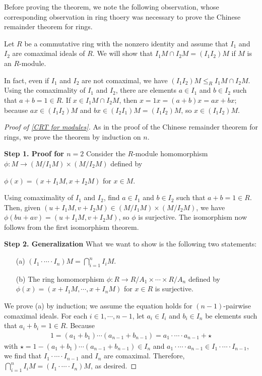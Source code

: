 Before proving the theorem, we note the following observation, whose corresponding observation in ring thoery was necessary to prove the Chinese remainder theorem for rings.
\begin{obs}
    Let $R$ be a commutative ring with the nonzero identity and assume that $I_1$ and $I_2$ are comaximal ideals of $R$.
    We will show that $I_1M\cap I_2M=(I_1I_2)M$ if $M$ is an $R$-module.

    In fact, even if $I_1$ and $I_2$ are not comaximal, we have $(I_1I_2)M\leq_R I_1M\cap I_2M$.
    Using the comaximality of $I_1$ and $I_2$, there are elements $a\in I_1$ and $b\in I_2$ such that $a+b=1\in R$.
    If $x\in I_1M\cap I_2M$, then $x=1x=(a+b)x=ax+bx$; because $ax\in(I_1I_2)M$ and $bx\in(I_2I_1)M=(I_1I_2)M$, so $x\in(I_1I_2)M$.
\end{obs}
\begin{proof}[Proof of \cref{CRT for modules}]
    As in the proof of the Chinese remainder theorem for rings, we prove the theorem by induction on $n$.

    \textbf{Step 1. Proof for $n=2$}\newline\indent
    Consider the $R$-module homomorphism $\phi: M\rightarrow (M/{I_1M})\times (M/{I_2M})$ defined by
    \begin{center}
        $\phi(x)=(x+I_1M, x+I_2M)$ for $x\in M$.
    \end{center}
    Using comaximality of $I_1$ and $I_2$, find $a\in I_1$ and $b\in I_2$ such that $a+b=1\in R$.
    Then, given $(u+I_1M, v+I_2M)\in (M/{I_1M})\times (M/{I_2M})$, we have $\phi(bu+av)=(u+I_1M, v+I_2M)$, so $\phi$ is surjective.
    The isomorphism now follows from the first isomorphism theorem.

    \textbf{Step 2. Generalization}\newline\indent
    What we want to show is the following two statements:
    \begin{enumerate}
        \item[(a)]
        {
            $(I_1\cdot\cdots\cdot I_n)M=\bigcap_{i=1}^n I_iM$.
        }
        \item[(b)]
        {
            The ring homomorphism $\phi:R\rightarrow R/A_1\times\cdots\times R/A_n$ defined by $\phi(x)=(x+I_1M, \cdots, x+I_nM)$ for $x\in R$ is surjective.
        }
    \end{enumerate}
    We prove (a) by induction; we assume the equation holds for $(n-1)$-pairwise comaximal ideals.
    For each $i\in 1, \cdots, n-1$, let $a_i\in I_i$ and $b_i\in I_n$ be elements such that $a_i+b_i=1\in R$.
    Because
    \begin{align*}
        1=(a_1+b_1)\cdots(a_{n-1}+b_{n-1})=a_1\cdot\cdots\cdot a_{n-1}+\star
    \end{align*}
    with $\star=1-(a_1+b_1)\cdots(a_{n-1}+b_{n-1})\in I_n$ and $a_1\cdot\cdots\cdot a_{n-1}\in I_1\cdot\cdots\cdot I_{n-1}$, we find that $I_1\cdot\cdots\cdot I_{n-1}$ and $I_n$ are comaximal.
    Therefore, $\bigcap_{i=1}^n I_iM=(I_1\cdot\cdots\cdot I_n)M$, as desired.


\end{proof}
